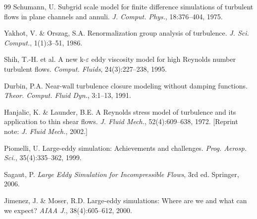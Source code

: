 \documentclass[12pt,a4paper]{article}
\theoremstyle{plain}
\theoremstyle{definition}
\theoremstyle{remark}
\newcommand{\eps}{\varepsilon}
\begin{document}
\begin{thebibliography}{99}
Schumann, U. Subgrid scale model for finite difference simulations of turbulent flows in plane channels and annuli. \textit{J. Comput. Phys.}, 18:376--404, 1975.

Yakhot, V. \& Orszag, S.A. Renormalization group analysis of turbulence. \textit{J. Sci. Comput.}, 1(1):3--51, 1986.

Shih, T.-H. et al. A new k-$\eps$ eddy viscosity model for high Reynolds number turbulent flows. \textit{Comput. Fluids}, 24(3):227--238, 1995.

Durbin, P.A. Near-wall turbulence closure modeling without damping functions. \textit{Theor. Comput. Fluid Dyn.}, 3:1--13, 1991.

Hanjalic, K. \& Launder, B.E. A Reynolds stress model of turbulence and its application to thin shear flows. \textit{J. Fluid Mech.}, 52(4):609--638, 1972. [Reprint note: \textit{J. Fluid Mech.}, 2002.]

Piomelli, U. Large-eddy simulation: Achievements and challenges. \textit{Prog. Aerosp. Sci.}, 35(4):335--362, 1999.

Sagaut, P. \textit{Large Eddy Simulation for Incompressible Flows}, 3rd ed. Springer, 2006.

Jimenez, J. \& Moser, R.D. Large-eddy simulations: Where are we and what can we expect? \textit{AIAA J.}, 38(4):605--612, 2000.

\end{thebibliography}
\end{document}
